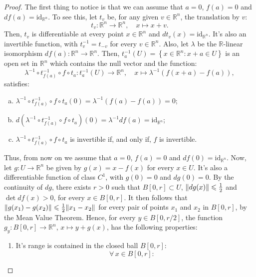 \begin{proof}
	The first thing to notice is that we can assume that \({a=0}\), \(f(a)=0\) and
	\(df(a)=\text{id}_{\mathbb{R}^{n}}\). To see this, let \(t_{v}\) be, for any
	given \({v}\in{\mathbb{R}^{n}}\), the translation by \(v\):
	\[
		t_{v}:\mathbb{R}^{n}\to\mathbb{R}^{n},\quad{{x}\mapsto{x+v}}.
	\]
	Then, \(t_{v}\) is differentiable at every point \({x}\in{\mathbb{R}^{n}}\)
	and \(dt_{v}(x)=\text{id}_{\mathbb{R}^{n}}\). It's also an invertible
	function, with \(t_{v}^{-1}=t_{-v}\) for every \({v}\in{\mathbb{R}^{n}}\).
	Also, let \(\lambda\) be the \(\mathbb{R}\)-linear isomorphism
	\(df(a):\mathbb{R}^{n}\to\mathbb{R}^{n}\). Then,
	\(t_{a}^{-1}(U)=\left\{{x}\in{\mathbb{R}^{n}}:{x+a}\in{U}\right\}\) is an open
	set in \(\mathbb{R}^{n}\) which contains the null vector and the function:
	\[
		\lambda^{-1}\circ{t_{f(a)}^{-1}}\circ{f}\circ{t_{a}}:t_{a}^{-1}(U)\to\mathbb{R}^{n},\quad{{x}\mapsto{\lambda^{-1}(f(x+a)-f(a))}},
	\]
	satisfies:
	\begin{enumerate}[a.]
		\item
		      \(\lambda^{-1}\circ{t_{f(a)}^{-1}}\circ{f}\circ{t_{a}}(0)=\lambda^{-1}\left(f(a)-f(a)\right)=0\);
		\item
		      \(d(\lambda^{-1}\circ{t_{f(a)}^{-1}}\circ{f}\circ{t_{a}})(0)=\lambda^{-1}df(a)=\text{id}_{\mathbb{R}^{n}}\);
		\item
		      \(\lambda^{-1}\circ{t_{f(a)}^{-1}}\circ{f}\circ{t_{a}}\) is
		      invertible if, and only if, \(f\) is invertible.
	\end{enumerate}
	Thus, from now on we assume that \(a=0\), \(f(a)=0\) and
	\(df(0)=\text{id}_{\mathbb{R}^{n}}\). Now, let \(g:{U}\to{\mathbb{R}^{n}}\) be
	given by \(g(x)=x-f(x)\) for every \({x}\in{U}\). It's also a differentiable
	function of class \(C^{1}\), with \(g(0)=0\) and \(dg(0)=0\). By the
	continuity of \(dg\), there exists \(r>0\) such that \({B[0,r]}\subset{U}\),
	\(\lVert dg(x)\rVert\leqslant{\frac{1}{2}}\) and \(\det{df(x)}>0\), for every
	\({x}\in{B[0,r]}\). It then follows that
	\(\lVert g(x_{1})-g(x_{2})\rVert\leqslant{\frac{1}{2}\lVert x_{1}-x_{2}\rVert}\) for every
	pair of points \(x_{1}\) and \(x_{2}\) in \(B[0,r]\), by the Mean Value
	Theorem. Hence, for every \({y}\in{B[0,r/2]}\), the function
	\(g_{y}:B[0,r]\to\mathbb{R}^{n}\), \({x}\mapsto{y+g(x)}\), has the following
	properties:
	\begin{enumerate}
		\item
		      It's range is contained in the closed ball \(B[0,r]\):
		      \[
			      \forall\,{x}\in{B[0,r]}:\quad
\]
\end{enumerate}
\end{proof}
